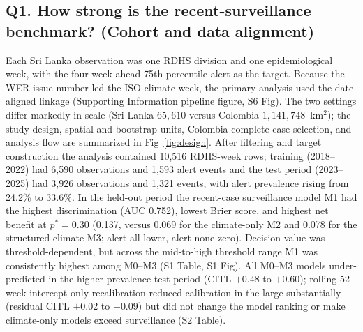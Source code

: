 \documentclass[11pt,a4paper]{article}
\begin{document}
\subsection{Q1. How strong is the recent-surveillance benchmark? (Cohort and data alignment)}
Each Sri Lanka observation was one RDHS division and one epidemiological week, with the four-week-ahead 75th-percentile alert as the target. Because the WER issue number led the ISO climate week, the primary analysis used the date-aligned linkage (Supporting Information pipeline figure, S6 Fig). The two settings differ markedly in scale (Sri Lanka $65{,}610$ versus Colombia $1{,}141{,}748$~km$^2$); the study design, spatial and bootstrap units, Colombia complete-case selection, and analysis flow are summarized in Fig~\ref{fig:design}. After filtering and target construction the analysis contained 10{,}516 RDHS-week rows; training (2018--2022) had 6{,}590 observations and 1{,}593 alert events and the test period (2023--2025) had 3{,}926 observations and 1{,}321 events, with alert prevalence rising from 24.2\% to 33.6\%. In the held-out period the recent-case surveillance model M1 had the highest discrimination (AUC 0.752), lowest Brier score, and highest net benefit at $p^*=0.30$ (0.137, versus 0.069 for the climate-only M2 and 0.078 for the structured-climate M3; alert-all lower, alert-none zero). Decision value was threshold-dependent, but across the mid-to-high threshold range M1 was consistently highest among M0--M3 (S1 Table, S1 Fig). All M0--M3 models under-predicted in the higher-prevalence test period (CITL $+0.48$ to $+0.60$); rolling 52-week intercept-only recalibration reduced calibration-in-the-large substantially (residual CITL $+0.02$ to $+0.09$) but did not change the model ranking or make climate-only models exceed surveillance (S2 Table).
\end{document}

